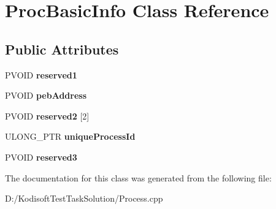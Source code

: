 \hypertarget{class_proc_basic_info}{\section{Proc\+Basic\+Info Class Reference}
\label{class_proc_basic_info}
}
\subsection*{Public Attributes}
\begin{DoxyCompactItemize}
\item 
\hypertarget{class_proc_basic_info_a978e20ddc58ffae9fbdf887316127930}{P\+V\+O\+I\+D {\bfseries reserved1}}\label{class_proc_basic_info_a978e20ddc58ffae9fbdf887316127930}

\item 
\hypertarget{class_proc_basic_info_af6a60ea7f7cb68d0ce6c5584dd951ee8}{P\+V\+O\+I\+D {\bfseries peb\+Address}}\label{class_proc_basic_info_af6a60ea7f7cb68d0ce6c5584dd951ee8}

\item 
\hypertarget{class_proc_basic_info_a82ad4da8ab23542be6195da7345fb823}{P\+V\+O\+I\+D {\bfseries reserved2} \mbox{[}2\mbox{]}}\label{class_proc_basic_info_a82ad4da8ab23542be6195da7345fb823}

\item 
\hypertarget{class_proc_basic_info_a79ee057404f6077046e2272137767cde}{U\+L\+O\+N\+G\+\_\+\+P\+T\+R {\bfseries unique\+Process\+Id}}\label{class_proc_basic_info_a79ee057404f6077046e2272137767cde}

\item 
\hypertarget{class_proc_basic_info_ac6915908299d762b8a554e30364879e2}{P\+V\+O\+I\+D {\bfseries reserved3}}\label{class_proc_basic_info_ac6915908299d762b8a554e30364879e2}

\end{DoxyCompactItemize}


The documentation for this class was generated from the following file\+:\begin{DoxyCompactItemize}
\item 
D\+:/\+Kodisoft\+Test\+Task\+Solution/Process.\+cpp\end{DoxyCompactItemize}
